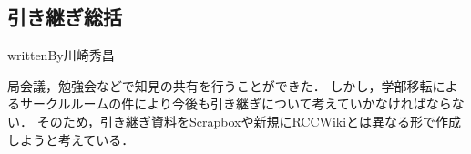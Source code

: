 \subsection*{引き継ぎ総括}

writtenBy{\systemStaff}{川崎}{秀昌}

局会議，勉強会などで知見の共有を行うことができた．
しかし，学部移転によるサークルルームの件により今後も引き継ぎについて考えていかなければならない．
そのため，引き継ぎ資料をScrapboxや新規にRCCWikiとは異なる形で作成しようと考えている．
